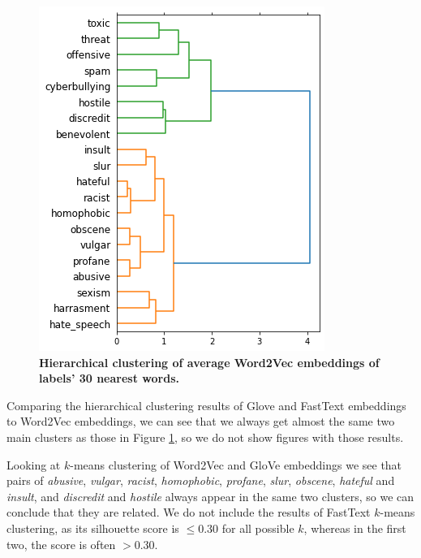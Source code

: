 \documentclass[fleqn,moreauthors,10pt]{ds_report}
\begin{document}
\begin{figure}[htb]\centering
	\includegraphics[width=\linewidth]{hier.png}
	\caption{\textbf{Hierarchical clustering of average Word2Vec embeddings of labels' 30 nearest words.}}
	\label{fig:hier}
\end{figure}

Comparing the hierarchical clustering results of Glove and FastText embeddings to Word2Vec embeddings, we can see that we always get almost the same two main clusters as those in Figure \ref{fig:hier}, so we do not show figures with those results. 

Looking at $k$-means clustering of Word2Vec and GloVe embeddings we see that pairs of \textit{abusive}, \textit{vulgar}, \textit{racist}, \textit{homophobic}, \textit{profane}, \textit{slur}, \textit{obscene}, \textit{hateful} and \textit{insult}, and \textit{discredit} and \textit{hostile} always appear in the same two clusters, so we can conclude that they are related. We do not include the results of FastText $k$-means clustering, as its silhouette score is $\le 0.30$ for all possible $k$, whereas in the first two, the score is often $> 0.30$. 
\end{document}
